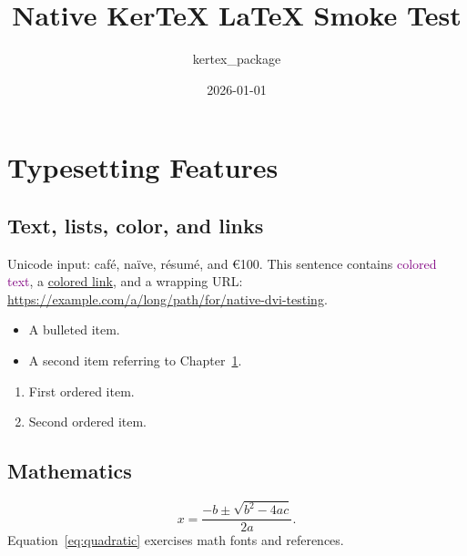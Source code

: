 \documentclass[10pt,letterpaper,openany]{report}
\title{Native KerTeX LaTeX Smoke Test}
\author{kertex\_package}
\date{2026-01-01}
\begin{document}
\maketitle
\tableofcontents

\chapter{Typesetting Features}\label{chap:features}
\section{Text, lists, color, and links}
Unicode input: café, naïve, résumé, and €100.  This sentence contains
\textcolor{purple}{colored text}, a \href{https://example.com}{colored link},
and a wrapping URL: \url{https://example.com/a/long/path/for/native-dvi-testing}.

\begin{itemize}
  \item A bulleted item.
  \item A second item referring to Chapter~\ref{chap:features}.
\end{itemize}
\begin{enumerate}
  \item First ordered item.
  \item Second ordered item.
\end{enumerate}

\section{Mathematics}
\begin{equation}\label{eq:quadratic}
  x = \frac{-b \pm \sqrt{b^2 - 4ac}}{2a}.
\end{equation}
Equation~\ref{eq:quadratic} exercises math fonts and references.
\end{document}
